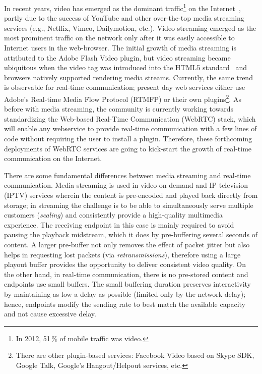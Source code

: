 In recent years, video has emerged as the dominant traffic\footnote{In 2012,
51\,\% of mobile traffic was video.} on the Internet~\cite{cvni.13,dawn.zb},
partly due to the success of YouTube and other over-the-top media streaming
services (e.g., Netflix, Vimeo, Dailymotion, etc.). Video streaming emerged as
the most prominent traffic on the network only after it was easily accessible
to Internet users in the web-browser. The initial growth of media streaming
is attributed to the Adobe Flash Video plugin, but video streaming became ubiquitous when
the video tag was introduced into the HTML5 standard~\cite{html5-spec} and
browsers natively supported rendering media streams. Currently, the same trend
is observable for real-time communication; present day web services either use
Adobe's Real-time Media Flow Protocol (RTMFP) \cite{draft.rtmfp} or 
their own plugins\footnote{There are other plugin-based services: Facebook
Video based on Skype SDK, Google Talk, Google's Hangout/Helpout services,
etc.}. As before with media streaming, the community is currently working
towards standardizing the Web-based Real-Time Communication (WebRTC) stack,
which will enable any webservice to provide real-time communication
with a few lines of code without requiring the user to install a plugin.
Therefore, these forthcoming deployments of WebRTC services are going to 
kick-start the growth of real-time communication on the Internet.


There are some fundamental differences between media streaming and real-time
communication. Media streaming is used in video on demand and IP television
(IPTV) services wherein the content is pre-encoded and played back directly
from storage; in streaming the challenge is to be able to simultaneously serve
multiple customers (\emph{scaling}) and consistently provide a high-quality
multimedia experience. The receiving endpoint in this case is mainly required
to avoid pausing the playback midstream, which it does by pre-buffering
several seconds of content. A larger pre-buffer not only removes the effect of
packet jitter but also helps in requesting lost packets (via
\emph{retransmissions}), therefore using a large playout buffer provides the
opportunity to deliver consistent video quality.
On the other hand, in real-time communication, there is no pre-stored content
and endpoints use small buffers. The small buffering duration preserves
interactivity by maintaining as low a delay as possible (limited only by the
network delay); hence, endpoints modify the sending rate to best match the
available capacity and not cause excessive delay.

